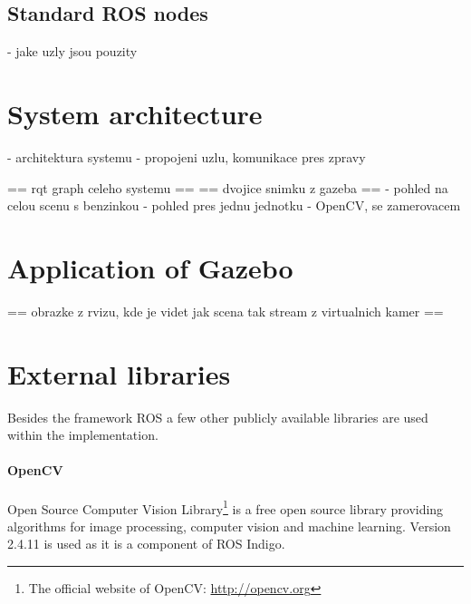 
\subsection{Standard ROS nodes}
- jake uzly jsou pouzity
	

\section{System architecture}
- architektura systemu - propojeni uzlu, komunikace pres zpravy

== rqt graph celeho systemu ==
== dvojice snimku z gazeba ==
	- pohled na celou scenu s benzinkou
	- pohled pres jednu jednotku - OpenCV, se zamerovacem

\section{Application of Gazebo} \label{txt:application_of_gazebo}

== obrazke z rvizu, kde je videt jak scena tak stream z virtualnich kamer ==

\section{External libraries} \label{txt:external_libraries}

Besides the framework ROS a few other publicly available libraries are used within the implementation.

\paragraph{OpenCV} Open Source Computer Vision Library\footnote{The official website of OpenCV: \url{http://opencv.org}} is a free open source library providing algorithms for image processing, computer vision and machine learning. Version 2.4.11 is used as it is a component of ROS Indigo.

